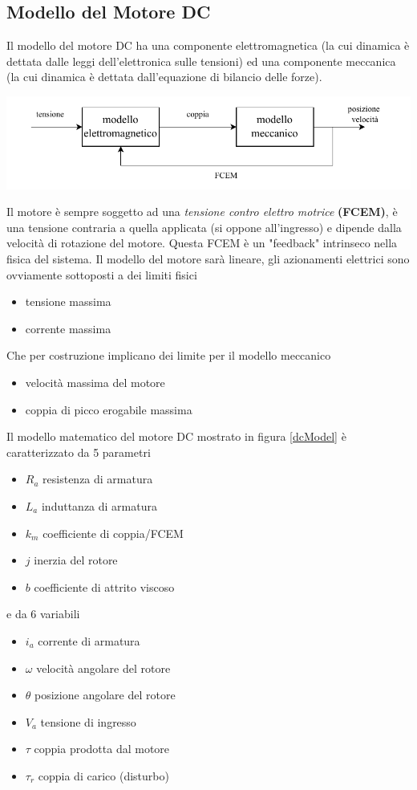 \documentclass[10pt, letterpaper]{report}
\begin{document}
\subsection{Modello del Motore DC}
Il modello del motore DC ha una componente elettromagnetica (la cui dinamica è dettata dalle leggi dell'elettronica sulle tensioni) ed una componente meccanica (la cui dinamica è dettata dall'equazione di bilancio delle forze).
\begin{center}
    \includegraphics[width=1\textwidth ]{images/modelloDC.pdf}
\end{center}
Il motore è sempre soggetto ad una \textit{tensione contro elettro motrice} \textbf{(FCEM)}, è una tensione contraria a quella applicata (si oppone all'ingresso) e dipende dalla velocità di rotazione del motore. Questa FCEM è un "feedback" intrinseco nella fisica del sistema.\acc 
Il modello del motore sarà lineare, gli azionamenti elettrici sono ovviamente sottoposti a dei limiti fisici\begin{itemize}
    \item tensione massima 
    \item corrente massima 
\end{itemize}
Che per costruzione implicano dei limite per il modello meccanico\begin{itemize}
    \item velocità massima del motore 
    \item coppia di picco erogabile massima 
\end{itemize}
Il modello matematico del motore DC mostrato in figura \ref{dcModel} è caratterizzato da 5 parametri \begin{itemize}
    \item $R_a$ resistenza di armatura 
    \item $L_a$ induttanza di armatura 
    \item $k_m$ coefficiente di coppia/FCEM 
    \item $j$ inerzia del rotore 
    \item $b$ coefficiente di attrito viscoso 
\end{itemize}
e da 6 variabili \begin{itemize}
    \item $i_a$ corrente di armatura 
    \item $\omega$ velocità angolare del rotore 
    \item $\theta$ posizione angolare del rotore 
    \item $V_a$ tensione di ingresso 
    \item $\tau$ coppia prodotta dal motore 
    \item $\tau_r$ coppia di carico (disturbo)
\end{itemize}
\end{document}
